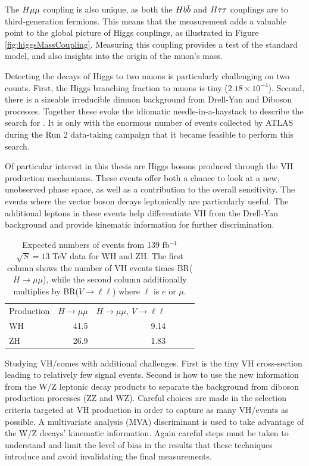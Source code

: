 The $H\mu\mu$ coupling is also unique, as both the $Hb\overline{b}$ and $H\tau\tau$ couplings are to third-generation fermions.
This means that the \hmm measurement adds a valuable point to the global picture of Higgs couplings, as illustrated in Figure \ref{fig:higgsMassCoupling}.
Measuring this coupling provides a test of the standard model, and also insights into the origin of the muon's mass.

Detecting the decays of Higgs to two muons is particularly challenging on two counts.
First, the Higgs branching fraction to muons is tiny ($2.18\times10^{-4}$).
Second, there is a sizeable irreducible dimuon background from Drell-Yan and Diboson processes.
Together these evoke the idiomatic needle-in-a-haystack to describe the search for \hmm.
It is only with the enormous number of events collected by ATLAS during the Run 2 data-taking campaign that it became feasible to perform this search.


Of particular interest in this thesis are Higgs bosons produced through the VH production mechanisms.
These events offer both a chance to look at a new, unobserved phase space, as well as a contribution to the overall \hmm sensitivity.
The events where the vector boson decays leptonically are particularly useful.
The additional leptons in these events help differentiate VH from the Drell-Yan background and provide kinematic information for further discrimination.

\begin{table}[htbp]
 \begin{center}
\begin{tabular}{l r r r r r}\toprule
Production   & $H\to\mu\mu$ & $H\to\mu\mu,~V\to\ell\ell$ \\
WH & 41.5 & 9.14 \\
ZH & 26.9 & 1.83 \\
\bottomrule\end{tabular}
 \end{center}
 \caption{Expected numbers of events from 139 fb$^{-1}$ $\sqrt{S}=13$ TeV data for WH and ZH. The first column shows the number of VH events times BR($H\to\mu\mu$), while the second column additionally multiplies by BR($V\to\ell\ell$) where $\ell$ is $e$ or $\mu$.}
\label{tab:vh-predict}
\end{table}

Studying VH/\hmm comes with additional challenges.
First is the tiny VH cross-section leading to relatively few signal events.
Second is how to use the new information from the W/Z leptonic decay products to separate the background from diboson production processes (ZZ and WZ).
Careful choices are made in the selection criteria targeted at VH production in order to capture as many VH/\hmm events as possible.
A multivariate analysis (MVA) discriminant is used to take advantage of the W/Z decays' kinematic information.
Again careful steps must be taken to understand and limit the level of bias in the results that these techniques introduce and avoid invalidating the final measurements.

